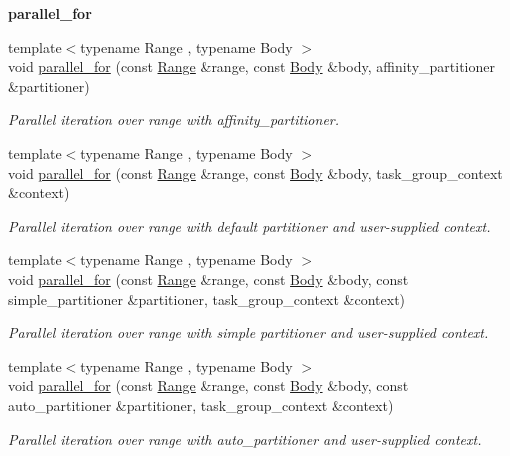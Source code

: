 \begin{Indent}{\bf parallel\+\_\+for}
\begin{DoxyCompactItemize}
{\footnotesize template$<$typename Range , typename Body $>$ }\\void \hyperlink{group__algorithms_gaf3d39e372d825bf54283b5ceafa90057}{parallel\+\_\+for} (const \hyperlink{classtbb_1_1blocked__range}{Range} \&range, const \hyperlink{classBody}{Body} \&body, affinity\+\_\+partitioner \&partitioner)
\begin{DoxyCompactList}\small\item\em Parallel iteration over range with affinity\+\_\+partitioner. \end{DoxyCompactList}\item 
{\footnotesize template$<$typename Range , typename Body $>$ }\\void \hyperlink{group__algorithms_ga93a621202db94665144de38c0b09bdad}{parallel\+\_\+for} (const \hyperlink{classtbb_1_1blocked__range}{Range} \&range, const \hyperlink{classBody}{Body} \&body, task\+\_\+group\+\_\+context \&context)
\begin{DoxyCompactList}\small\item\em Parallel iteration over range with default partitioner and user-\/supplied context. \end{DoxyCompactList}\item 
{\footnotesize template$<$typename Range , typename Body $>$ }\\void \hyperlink{group__algorithms_ga5b7fab9d6ffe7a9345e9349a5a007bd4}{parallel\+\_\+for} (const \hyperlink{classtbb_1_1blocked__range}{Range} \&range, const \hyperlink{classBody}{Body} \&body, const simple\+\_\+partitioner \&partitioner, task\+\_\+group\+\_\+context \&context)
\begin{DoxyCompactList}\small\item\em Parallel iteration over range with simple partitioner and user-\/supplied context. \end{DoxyCompactList}\item 
{\footnotesize template$<$typename Range , typename Body $>$ }\\void \hyperlink{group__algorithms_ga4c9935d8710a5cf786a92f3522ab2976}{parallel\+\_\+for} (const \hyperlink{classtbb_1_1blocked__range}{Range} \&range, const \hyperlink{classBody}{Body} \&body, const auto\+\_\+partitioner \&partitioner, task\+\_\+group\+\_\+context \&context)
\begin{DoxyCompactList}\small\item\em Parallel iteration over range with auto\+\_\+partitioner and user-\/supplied context. \end{DoxyCompactList}\item 

\end{DoxyCompactItemize}
\end{Indent}
